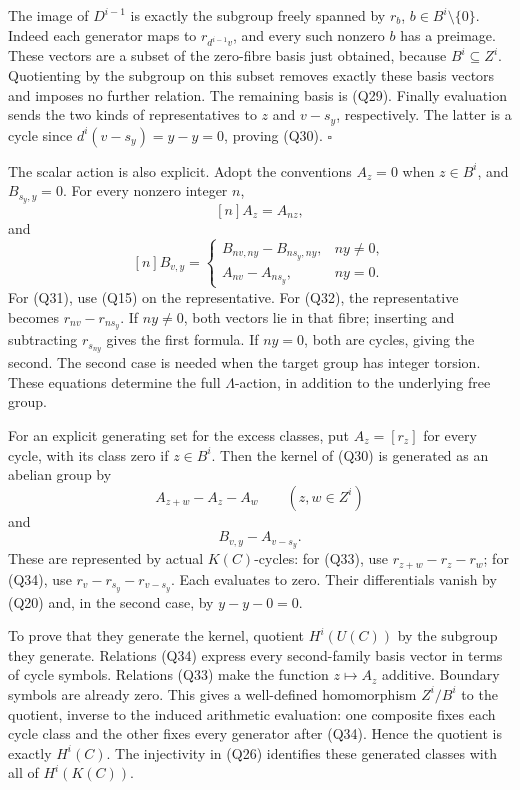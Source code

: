 \documentclass[
]{article}
\begin{document}
The image of \(D^{i-1}\) is exactly the subgroup freely spanned by
\(r_b\), \(b\in B^i\setminus\{0\}\). Indeed each generator maps to
\(r_{d^{i-1}v}\), and every such nonzero \(b\) has a preimage. These
vectors are a subset of the zero-fibre basis just obtained, because
\(B^i\subseteq Z^i\). Quotienting by the subgroup on this subset removes
exactly these basis vectors and imposes no further relation. The
remaining basis is (Q29). Finally evaluation sends the two kinds of
representatives to \(z\) and \(v-s_y\), respectively. The latter is a
cycle since \(d^i(v-s_y)=y-y=0\), proving (Q30). \(\square\)

The scalar action is also explicit. Adopt the conventions \(A_z=0\) when
\(z\in B^i\), and \(B_{s_y,y}=0\). For every nonzero integer \(n\), \[
[n]A_z=A_{nz},
\tag{Q31}
\] and \[
[n]B_{v,y}=
\begin{cases}
B_{nv,ny}-B_{ns_y,ny},&ny\ne0,\\
A_{nv}-A_{ns_y},&ny=0.
\end{cases}
\tag{Q32}
\] For (Q31), use (Q15) on the representative. For (Q32), the
representative becomes \(r_{nv}-r_{ns_y}\). If \(ny\ne0\), both vectors
lie in that fibre; inserting and subtracting \(r_{s_{ny}}\) gives the
first formula. If \(ny=0\), both are cycles, giving the second. The
second case is needed when the target group has integer torsion. These
equations determine the full \(\Lambda\)-action, in addition to the
underlying free group.

For an explicit generating set for the excess classes, put \(A_z=[r_z]\)
for every cycle, with its class zero if \(z\in B^i\). Then the kernel of
(Q30) is generated as an abelian group by \[
A_{z+w}-A_z-A_w\qquad(z,w\in Z^i)
\tag{Q33}
\] and \[
B_{v,y}-A_{v-s_y}.
\tag{Q34}
\] These are represented by actual \(K(C)\)-cycles: for (Q33), use
\(r_{z+w}-r_z-r_w\); for (Q34), use \(r_v-r_{s_y}-r_{v-s_y}\). Each
evaluates to zero. Their differentials vanish by (Q20) and, in the
second case, by \(y-y-0=0\).

To prove that they generate the kernel, quotient \(H^i(U(C))\) by the
subgroup they generate. Relations (Q34) express every second-family
basis vector in terms of cycle symbols. Relations (Q33) make the
function \(z\mapsto A_z\) additive. Boundary symbols are already zero.
This gives a well-defined homomorphism \(Z^i/B^i\) to the quotient,
inverse to the induced arithmetic evaluation: one composite fixes each
cycle class and the other fixes every generator after (Q34). Hence the
quotient is exactly \(H^i(C)\). The injectivity in (Q26) identifies
these generated classes with all of \(H^i(K(C))\).
\end{document}
